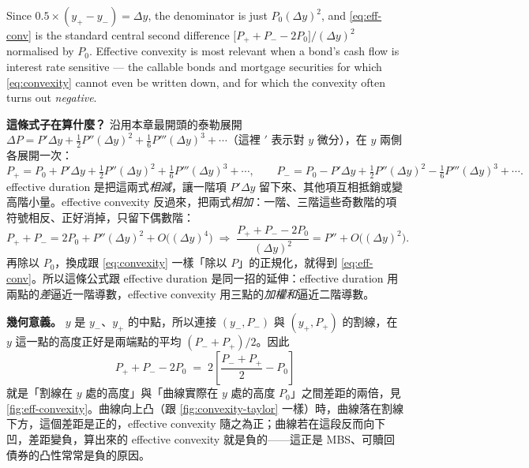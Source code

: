\suppstart
Since $0.5\times(y_{+}-y_{-})=\Delta y$, the denominator is just $P_{0}(\Delta y)^{2}$, and \eqref{eq:eff-conv} is the standard central second difference $\bigl[P_{+}+P_{-}-2P_{0}\bigr]/(\Delta y)^{2}$ normalised by $P_{0}$.
Effective convexity is most relevant when a bond's cash flow is interest rate sensitive --- the callable bonds and mortgage securities for which \eqref{eq:convexity} cannot even be written down, and for which the convexity often turns out \emph{negative}.

\begin{remark}
	\textbf{這條式子在算什麼？} 沿用本章最開頭的泰勒展開 $\Delta P=P'\Delta y+\frac12P''(\Delta y)^{2}+\frac16P'''(\Delta y)^{3}+\cdots$（這裡 $'$ 表示對 $y$ 微分），在 $y$ 兩側各展開一次：
	\[
		P_{+}=P_{0}+P'\Delta y+\tfrac12P''(\Delta y)^{2}+\tfrac16P'''(\Delta y)^{3}+\cdots,
		\qquad
		P_{-}=P_{0}-P'\Delta y+\tfrac12P''(\Delta y)^{2}-\tfrac16P'''(\Delta y)^{3}+\cdots.
	\]
	effective duration 是把這兩式\emph{相減}，讓一階項 $P'\Delta y$ 留下來、其他項互相抵銷或變高階小量。effective convexity 反過來，把兩式\emph{相加}：一階、三階這些奇數階的項符號相反、正好消掉，只留下偶數階：
	\[
		P_{+}+P_{-} = 2P_{0}+P''(\Delta y)^{2}+O\bigl((\Delta y)^{4}\bigr)
		\;\Longrightarrow\;
		\frac{P_{+}+P_{-}-2P_{0}}{(\Delta y)^{2}} = P''+O\bigl((\Delta y)^{2}\bigr).
	\]
	再除以 $P_{0}$，換成跟 \eqref{eq:convexity} 一樣「除以 $P$」的正規化，就得到 \eqref{eq:eff-conv}。所以這條公式跟 effective duration 是同一招的延伸：effective duration 用兩點的\emph{差}逼近一階導數，effective convexity 用三點的\emph{加權和}逼近二階導數。

	\textbf{幾何意義。} $y$ 是 $y_{-}$、$y_{+}$ 的中點，所以連接 $(y_{-},P_{-})$ 與 $(y_{+},P_{+})$ 的割線，在 $y$ 這一點的高度正好是兩端點的平均 $(P_{-}+P_{+})/2$。因此
	\[
		P_{+}+P_{-}-2P_{0} \;=\; 2\left[\frac{P_{-}+P_{+}}{2}-P_{0}\right]
	\]
	就是「割線在 $y$ 處的高度」與「曲線實際在 $y$ 處的高度 $P_{0}$」之間差距的兩倍，見 \autoref{fig:eff-convexity}。曲線向上凸（跟 \autoref{fig:convexity-taylor} 一樣）時，曲線落在割線下方，這個差距是正的，effective convexity 隨之為正；曲線若在這段反而向下凹，差距變負，算出來的 effective convexity 就是負的——這正是 MBS、可贖回債券的凸性常常是負的原因。
\end{remark}

